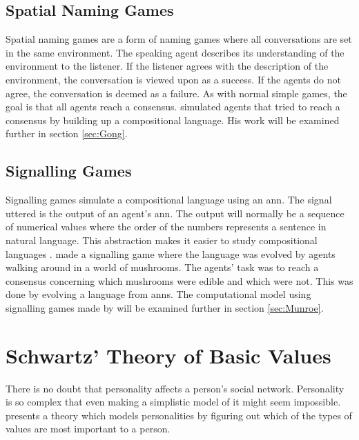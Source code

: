 \subsection{Spatial Naming Games}\label{SpatNamingGame}
Spatial naming games are a form of naming games where all conversations are set in the same environment. The speaking agent describes its understanding of the environment to the listener. If the listener agrees with the description of the environment, the conversation is viewed upon as a success. If the agents do not agree, the conversation is deemed as a failure. As with normal simple games, the goal is that all agents reach a consensus. \citeauthor{gong2011simulating} simulated agents that tried to reach a consensus by building up a compositional language. His work will be examined further in section \ref{sec:Gong}.

\subsection{Signalling Games}
Signalling games simulate a compositional language using an \ac{ann}. The signal uttered is the output of an agent's \ac{ann}. The output will normally be a sequence of numerical values where the order of the numbers represents a sentence in natural language. This abstraction makes it easier to study compositional languages \citep{munroe2002learning, suzuki2008learning}. \citeauthor{munroe2002learning} made a signalling game where the language was evolved by agents walking around in a world of mushrooms. The agents' task was to reach a consensus concerning which mushrooms were edible and which were not. This was done by evolving a language from \acp{ann}. The computational model using signalling games made by \citeauthor{munroe2002learning} will be examined further in section \ref{sec:Munroe}.


\section{Schwartz' Theory of Basic Values}\label{SchwartzBasicValues}
There is no doubt that personality affects a person's social network. Personality is so complex that even making a simplistic model of it might seem impossible. \citet{schwartz1992unniversals} presents a theory which models personalities by figuring out which of the types of values are most important to a person.

